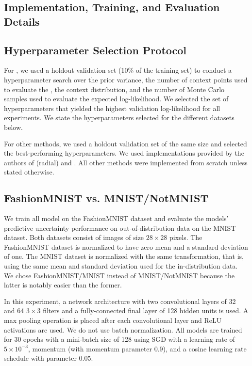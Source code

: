 \begin{appendices}
\section{Implementation, Training, and Evaluation Details}
\label{appsec:model_details}



\subsection{Hyperparameter Selection Protocol}

For \fsvi, we used a holdout validation set (10\% of the training set) to conduct a hyperparameter search over the prior variance, the number of context points used to evaluate the \kld, the context distribution, and the number of Monte Carlo samples used to evaluate the expected log-likelihood.
We selected the set of hyperparameters that yielded the highest validation log-likelihood for all experiments.
We state the hyperparameters selected for the different datasets below.


For other methods, we used a holdout validation set of the same size and selected the best-performing hyperparameters.
We used implementations provided by the authors of \mfvi (radial) and \swag.
All other methods were implemented from scratch unless stated otherwise.




\subsection{FashionMNIST vs. MNIST/NotMNIST}

We train all model on the FashionMNIST dataset and evaluate the models' predictive uncertainty performance on out-of-distribution data on the MNIST dataset.
Both datasets consist of images of size $28 \times 28$ pixels.
The FashionMNIST dataset is normalized to have zero mean and a standard deviation of one.
The MNIST dataset is normalized with the same transformation, that is, using the same mean and standard deviation used for the in-distribution data.
We chose FashionMNIST/MNIST instead of MNIST/NotMNIST because the latter is notably easier than the former.

In this experiment, a network architecture with two convolutional layers of 32 and 64 $3 \times 3$ filters and a fully-connected final layer of 128 hidden units is used.
A max pooling operation is placed after each convolutional layer and ReLU activations are used.
We do not use batch normalization.
All models are trained for 30 epochs with a mini-batch size of 128 using SGD with a learning rate of $5 \times 10^{-3}$, momentum (with momentum parameter 0.9), and a cosine learning rate schedule with parameter $0.05$.


\end{appendices}
